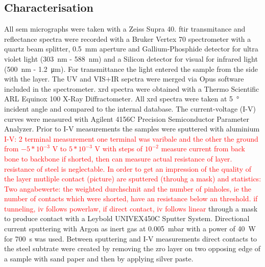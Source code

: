 \documentclass[a4paper]{article}
\newcommand{\td}[1]{\textcolor{red}{#1}}
\begin{document}
\subsection{Characterisation}
All \gls{sem} micrographs were taken with a Zeiss Supra 40. 
\Gls{ftir} transmitance and reflectance spectra were recorded with a Bruker Vertex 70 
spectrometer with a quartz beam splitter, \SI{0.5}{\milli\meter} aperture and 
Gallium-Phosphide detector for ultra violet light (\SI{303}{\nano\meter} - \SI{588}{\nano\meter})
and a Silicon detector for visual for 
infrared light (\SI{500}{\nano\meter} - \SI{1.2}{\micro\meter}). For transmittance the light
entered the sample from the side with the layer. The UV and VIS+IR sepctra were merged via 
Opus software included in the spectrometer. 
\Gls{xrd} spectra were obtained with a Thermo Scientific ARL Equinox 100 X-Ray Diffractometer. 
All \gls{xrd} spectra were taken at \SI{5}{\degree} incident angle and compared to the internal database.
The current-voltage (I-V) curves were measured with Agilent 4156C Precision Semiconductor 
Parameter Analyzer. Prior to I-V measurements the samples were sputtered with aluminium 
\td{I-V: 2 terminal measurement 
one terminal was varibale and the other the ground 
from $-5*10^{-3}$ V to $5*10^{-3}$ V with steps of $10^{-2}$
measure current from back bone to backbone 
if shorted, then can measure actual resistance of layer. resistance of steel 
is neglectable. In order to get an impression of the quality of the layer 
mutliple contact (picture) are sputtered (throuhg a mask) and statistics: 
Two angabewerte: the weighted durchschnit and the number of pinholes, ie the number of contacts which were shorted, have an resistance below an threshold.
if tunneling, iv follows powerlaw, if direct contact, iv follows linear
}
through a mask to produce contact with a Leybold 
UNIVEX450C Sputter System.
Directional current sputtering with Argon as inert gas at \SI{0.005}{\milli\bar} with a 
power of \SI{40}{\watt} for \SI{700}{\second} was used. Between sputtering and I-V measurements 
direct contacts to the steel subtrate were created by removing the \gls{zro} layer on two 
opposing edge of a sample with sand paper and then by applying silver paste.
\end{document}

